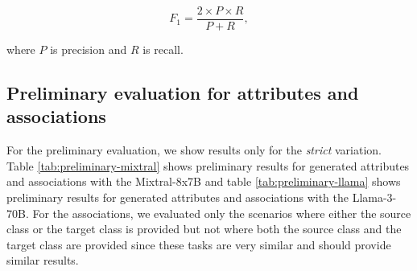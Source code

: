 \[ F_{1} = \dfrac{2 \times P \times R}{P + R}, \]

\noindent where $P$ is precision and $R$ is recall.


\subsection{Preliminary evaluation for attributes and associations}
\label{sec:preliminary_attributes_associations}

For the preliminary evaluation, we show results only for the \textit{strict} variation. Table \ref{tab:preliminary-mixtral} shows preliminary results for generated attributes and associations with the Mixtral-8x7B and table \ref{tab:preliminary-llama} shows preliminary results for generated attributes and associations with the Llama-3-70B. For the associations, we evaluated only the scenarios where either the source class or the target class is provided but not where both the source class and the target class are provided since these tasks are very similar and should provide similar results.

